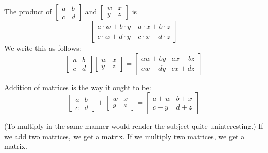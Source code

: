 \documentclass{article}
\begin{document}
The product of $\begin{bmatrix} a & b \\ c & d \end{bmatrix}$ and $\begin{bmatrix} w & x \\ y & z \end{bmatrix}$ is
\begin{equation*}
\begin{bmatrix}
  a \cdot w+b \cdot y & \ a \cdot x+b \cdot z \\
  c \cdot w+d \cdot y & \ c \cdot x+d \cdot z 
\end{bmatrix}
\end{equation*}
We write this as follows:
\begin{equation*}
\begin{bmatrix} a & b \\ c & d \end{bmatrix} \begin{bmatrix} w & x \\ y & z \end{bmatrix}
= \begin{bmatrix} aw+by & ax+bz \\ cw+dy & cx+dz \end{bmatrix}
\end{equation*}

Addition of matrices is the way it ought to be:
\begin{equation*}
\begin{bmatrix} a & b \\ c & d \end{bmatrix} + \begin{bmatrix} w & x \\ y & z \end{bmatrix}
= \begin{bmatrix} a+w & b+x \\ c+y & d+z \end{bmatrix}
\end{equation*}

(To multiply in the same manner would render the subject quite uninteresting.) If we add two matrices, we get a matrix. If we multiply two matrices, we get a matrix.
\end{document}
